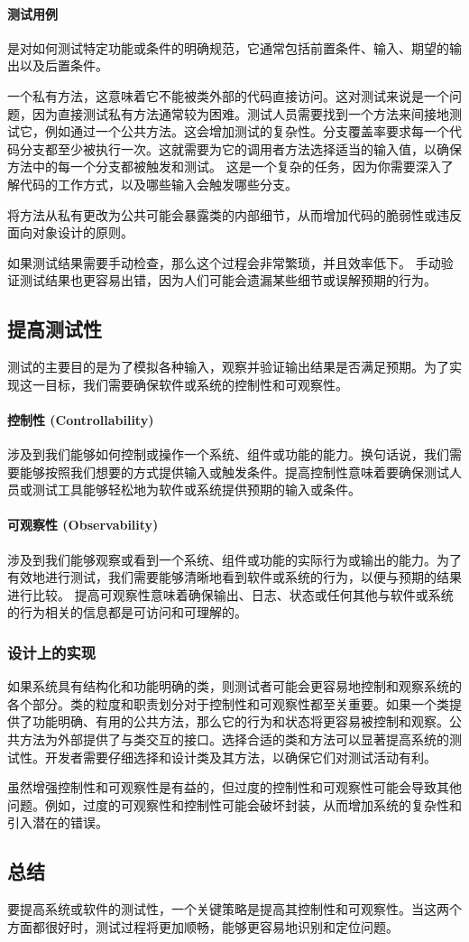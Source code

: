\paragraph{测试用例}是对如何测试特定功能或条件的明确规范，它通常包括前置条件、输入、期望的输出以及后置条件。

一个私有方法，这意味着它不能被类外部的代码直接访问。这对测试来说是一个问题，因为直接测试私有方法通常较为困难。测试人员需要找到一个方法来间接地测试它，例如通过一个公共方法。这会增加测试的复杂性。分支覆盖率要求每一个代码分支都至少被执行一次。这就需要为它的调用者方法选择适当的输入值，以确保方法中的每一个分支都被触发和测试。
这是一个复杂的任务，因为你需要深入了解代码的工作方式，以及哪些输入会触发哪些分支。

将方法从私有更改为公共可能会暴露类的内部细节，从而增加代码的脆弱性或违反面向对象设计的原则。

如果测试结果需要手动检查，那么这个过程会非常繁琐，并且效率低下。
手动验证测试结果也更容易出错，因为人们可能会遗漏某些细节或误解预期的行为。

\subsection{提高测试性}
测试的主要目的是为了模拟各种输入，观察并验证输出结果是否满足预期。为了实现这一目标，我们需要确保软件或系统的控制性和可观察性。

\paragraph{控制性 (Controllability)}涉及到我们能够如何控制或操作一个系统、组件或功能的能力。换句话说，我们需要能够按照我们想要的方式提供输入或触发条件。提高控制性意味着要确保测试人员或测试工具能够轻松地为软件或系统提供预期的输入或条件。

\paragraph{可观察性 (Observability)}
涉及到我们能够观察或看到一个系统、组件或功能的实际行为或输出的能力。为了有效地进行测试，我们需要能够清晰地看到软件或系统的行为，以便与预期的结果进行比较。
提高可观察性意味着确保输出、日志、状态或任何其他与软件或系统的行为相关的信息都是可访问和可理解的。

\subsubsection{设计上的实现}
如果系统具有结构化和功能明确的类，则测试者可能会更容易地控制和观察系统的各个部分。类的粒度和职责划分对于控制性和可观察性都至关重要。如果一个类提供了功能明确、有用的公共方法，那么它的行为和状态将更容易被控制和观察。公共方法为外部提供了与类交互的接口。选择合适的类和方法可以显著提高系统的测试性。开发者需要仔细选择和设计类及其方法，以确保它们对测试活动有利。

虽然增强控制性和可观察性是有益的，但过度的控制性和可观察性可能会导致其他问题。例如，过度的可观察性和控制性可能会破坏封装，从而增加系统的复杂性和引入潜在的错误。

\subsection{总结}
要提高系统或软件的测试性，一个关键策略是提高其控制性和可观察性。当这两个方面都很好时，测试过程将更加顺畅，能够更容易地识别和定位问题。
